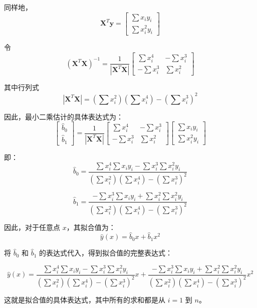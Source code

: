 \documentclass[UTF8]{report}
\theoremstyle{MyLineTheoremStyle} %
\theoremstyle{MyBlockTheoremStyle} %
\theoremstyle{MySubsubsectionStyle} %
\begin{document}
同样地，
$$\mathbf{X}^T\mathbf{y} = \begin{bmatrix}
\sum x_iy_i \\
\sum x_i^2y_i
\end{bmatrix}$$

令 $$(\mathbf{X}^T\mathbf{X})^{-1} = \frac{1}{|\mathbf{X}^T\mathbf{X}|}\begin{bmatrix}
\sum x_i^4 & -\sum x_i^3 \\
-\sum x_i^3 & \sum x_i^2
\end{bmatrix}$$

其中行列式 $$|\mathbf{X}^T\mathbf{X}| = (\sum x_i^2)(\sum x_i^4) - (\sum x_i^3)^2$$

因此，最小二乘估计的具体表达式为：
$$\begin{bmatrix}
\hat{b}_0 \\
\hat{b}_1
\end{bmatrix} = \frac{1}{|\mathbf{X}^T\mathbf{X}|}\begin{bmatrix}
\sum x_i^4 & -\sum x_i^3 \\
-\sum x_i^3 & \sum x_i^2
\end{bmatrix}\begin{bmatrix}
\sum x_iy_i \\
\sum x_i^2y_i
\end{bmatrix}$$

即：
$$\hat{b}_0 = \frac{\sum x_i^4\sum x_iy_i - \sum x_i^3\sum x_i^2y_i}{(\sum x_i^2)(\sum x_i^4) - (\sum x_i^3)^2}$$

$$\hat{b}_1 = \frac{-\sum x_i^3\sum x_iy_i + \sum x_i^2\sum x_i^2y_i}{(\sum x_i^2)(\sum x_i^4) - (\sum x_i^3)^2}$$

因此，对于任意点 $x$，其拟合值为：
$$\hat{y}(x) = \hat{b}_0x + \hat{b}_1x^2$$

将 $\hat{b}_0$ 和 $\hat{b}_1$ 的表达式代入，得到拟合值的完整表达式：

$$\hat{y}(x) = \frac{\sum x_i^4\sum x_iy_i - \sum x_i^3\sum x_i^2y_i}{(\sum x_i^2)(\sum x_i^4) - (\sum x_i^3)^2}x + \frac{-\sum x_i^3\sum x_iy_i + \sum x_i^2\sum x_i^2y_i}{(\sum x_i^2)(\sum x_i^4) - (\sum x_i^3)^2}x^2$$

这就是拟合值的具体表达式，其中所有的求和都是从 $i=1$ 到 $n$。
\end{document}
